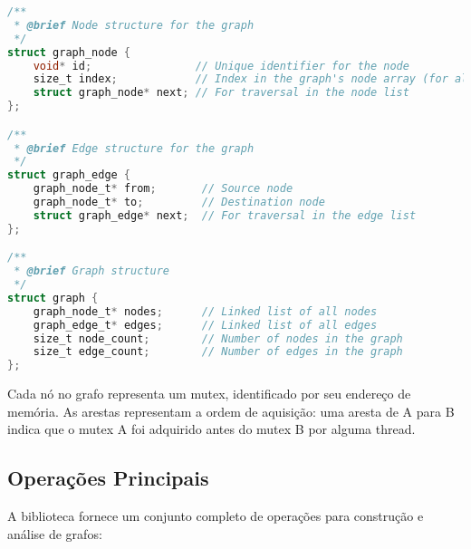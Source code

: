 \begin{lstlisting}[language=C, caption={Estruturas de dados para representação de grafos}]
/**
 * @brief Node structure for the graph
 */
struct graph_node {
    void* id;                // Unique identifier for the node
    size_t index;            // Index in the graph's node array (for algorithms)
    struct graph_node* next; // For traversal in the node list
};

/**
 * @brief Edge structure for the graph
 */
struct graph_edge {
    graph_node_t* from;       // Source node
    graph_node_t* to;         // Destination node
    struct graph_edge* next;  // For traversal in the edge list
};

/**
 * @brief Graph structure
 */
struct graph {
    graph_node_t* nodes;      // Linked list of all nodes
    graph_edge_t* edges;      // Linked list of all edges
    size_t node_count;        // Number of nodes in the graph
    size_t edge_count;        // Number of edges in the graph
};
\end{lstlisting}

Cada nó no grafo representa um mutex, identificado por seu endereço de memória. As arestas representam a ordem de aquisição: uma aresta de A para B indica que o mutex A foi adquirido antes do mutex B por alguma thread.

\subsection{Operações Principais}

A biblioteca fornece um conjunto completo de operações para construção e análise de grafos:

